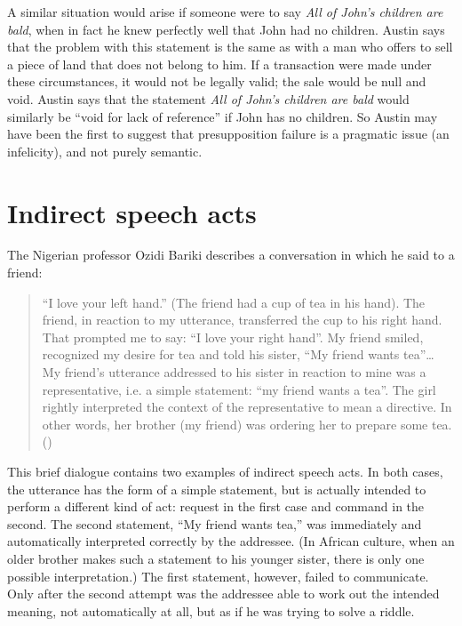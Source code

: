 A similar situation would arise if someone were to say \textit{All of John’s children are bald}, when in fact he knew perfectly well that John had no children. Austin says that the problem with this statement is the same as with a man who offers to sell a piece of land that does not belong to him. If a transaction were made under these circumstances, it would not be legally valid; the sale would be null and void. Austin says that the statement \textit{All of John’s children are bald} would similarly be “void for lack of reference” if John has no children. So Austin may have been the first to suggest that presupposition failure is a pragmatic issue (an infelicity), and not purely semantic.


\section{Indirect speech acts}\label{sec:10.3}

The Nigerian professor Ozidi Bariki describes a conversation in which he said to a friend:


\begin{quote}
“I love your left hand.” (The friend had a cup of tea in his hand). The friend, in reaction to my utterance, transferred the cup to his right hand. That prompted me to say: “I love your right hand”. My friend smiled, recognized my desire for tea and told his sister, “My friend wants tea”… My friend’s utterance addressed to his sister in reaction to mine was a representative, i.e. a simple statement: “my friend wants a tea”. The girl rightly interpreted the context of the representative to mean a directive. In other words, her brother (my friend) was ordering her to prepare some tea.  (\citealt{Bariki2008})
\end{quote}


This brief dialogue contains two examples of indirect speech acts. In both cases, the utterance has the form of a simple statement, but is actually intended to perform a different kind of act: request in the first case and command in the second. The second statement, “My friend wants tea,” was immediately and automatically interpreted correctly by the addressee. (In African culture, when an older brother makes such a statement to his younger sister, there is only one possible interpretation.) The first statement, however, failed to communicate. Only after the second attempt was the addressee able to work out the intended meaning, not automatically at all, but as if he was trying to solve a riddle.



